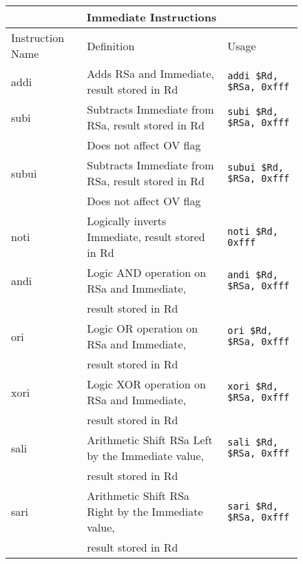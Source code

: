 \documentclass[letterpaper, 11pt]{article}
\begin{document}
\begin{figure}[!h]
	\begin{center}
		\begin{tabular}{|l|l|l|}
			\hline
			\multicolumn{3}{c}{Immediate Instructions} \\ \hline
			Instruction Name	& Definition															& Usage 							\\ \hline
			addi				& Adds RSa and Immediate, result stored in Rd							& \texttt{addi \$Rd, \$RSa, 0xfff}	\\ \hline
			subi				& Subtracts Immediate from RSa, result stored in Rd						& \texttt{subi \$Rd, \$RSa, 0xfff}	\\ \hline
			\hfill				& Does not affect OV flag												& \hfill 							\\ \hline
			subui 				& Subtracts Immediate from RSa, result stored in Rd						& \texttt{subui \$Rd, \$RSa, 0xfff}	\\ 
			\hfill				& Does not affect OV flag												& \hfill 							\\ \hline
			noti				& Logically inverts Immediate, result stored in Rd						& \texttt{noti \$Rd, 	0xfff}		\\ \hline
			andi				& Logic AND operation on RSa and Immediate, 							& \texttt{andi \$Rd, \$RSa, 0xfff}	\\ 
			\hfill				& result stored in Rd													& \hfill 							\\ \hline	
			ori					& Logic OR operation on RSa and Immediate, 								& \texttt{ori \$Rd, \$RSa, 0xfff}	\\ 
			\hfill				& result stored in Rd													& \hfill 							\\ \hline		
			xori				& Logic XOR operation on RSa and Immediate, 							& \texttt{xori \$Rd, \$RSa, 0xfff}	\\ 
			\hfill				& result stored in Rd													& \hfill 							\\ \hline					
			sali				& Arithmetic Shift RSa Left by the Immediate value,						& \texttt{sali \$Rd, \$RSa, 0xfff}	\\ 	
			\hfill				& result stored in Rd													& \hfill 							\\ \hline				
			sari				& Arithmetic Shift RSa Right by the Immediate value,					& \texttt{sari \$Rd, \$RSa, 0xfff}	\\ 	
			\hfill				& result stored in Rd													& \hfill 							\\ \hline				

\end{tabular}
\end{center}
\end{figure}
\end{document}
